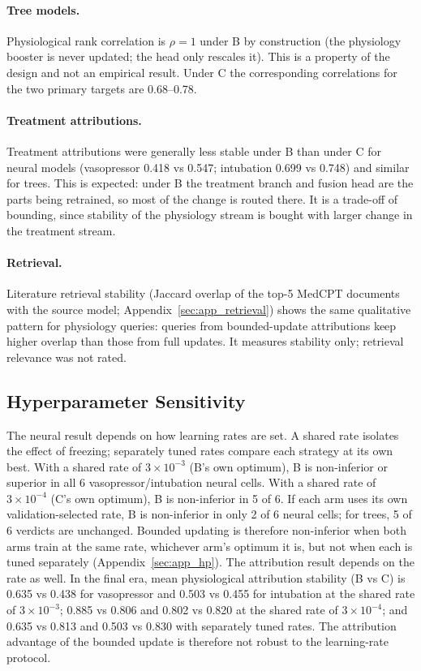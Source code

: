 \documentclass[10pt,a4paper,twocolumn]{article}
\begin{document}
	\paragraph{Tree models.} Physiological rank correlation is $\rho = 1$ under B by construction (the physiology booster is never updated; the head only rescales it). This is a property of the design and not an empirical result. Under C the corresponding correlations for the two primary targets are 0.68--0.78.
	
	\paragraph{Treatment attributions.} Treatment attributions were generally less stable under B than under C for neural models (vasopressor 0.418 vs 0.547; intubation 0.699 vs 0.748) and similar for trees. This is expected: under B the treatment branch and fusion head are the parts being retrained, so most of the change is routed there. It is a trade-off of bounding, since stability of the physiology stream is bought with larger change in the treatment stream.
	
	\paragraph{Retrieval.} Literature retrieval stability (Jaccard overlap of the top-5 MedCPT documents with the source model; Appendix~\ref{sec:app_retrieval}) shows the same qualitative pattern for physiology queries: queries from bounded-update attributions keep higher overlap than those from full updates. It measures stability only; retrieval relevance was not rated.
	
	\subsection{Hyperparameter Sensitivity}
	\label{sec:res_hp}
	The neural result depends on how learning rates are set. A shared rate isolates the effect of freezing; separately tuned rates compare each strategy at its own best. With a shared rate of $3\times10^{-3}$ (B's own optimum), B is non-inferior or superior in all 6 vasopressor/intubation neural cells. With a shared rate of $3\times10^{-4}$ (C's own optimum), B is non-inferior in 5 of 6. If each arm uses its own validation-selected rate, B is non-inferior in only 2 of 6 neural cells; for trees, 5 of 6 verdicts are unchanged. Bounded updating is therefore non-inferior when both arms train at the same rate, whichever arm's optimum it is, but not when each is tuned separately (Appendix~\ref{sec:app_hp}). The attribution result depends on the rate as well. In the final era, mean physiological attribution stability (B vs C) is 0.635 vs 0.438 for vasopressor and 0.503 vs 0.455 for intubation at the shared rate of $3\times10^{-3}$; 0.885 vs 0.806 and 0.802 vs 0.820 at the shared rate of $3\times10^{-4}$; and 0.635 vs 0.813 and 0.503 vs 0.830 with separately tuned rates. The attribution advantage of the bounded update is therefore not robust to the learning-rate protocol.
	
\end{document}
